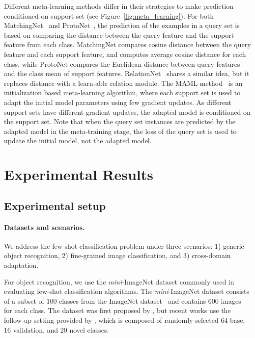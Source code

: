 \documentclass{article}
\newlength\paramargin
\newlength\secmargin
\newcommand{\figref}[1]{Figure~\ref{fig:#1}}
\def \miniI {\emph{mini}-ImageNet }
\begin{document}
Different meta-learning methods differ in their strategies to make prediction conditioned on support set (see \figref{meta_learning}). For both MatchingNet~\cite{vinyals2016matching} and ProtoNet~\cite{snell2017prototypical}, the prediction of the examples in a query set  is based on comparing the distance between the query feature and the support feature from each class. MatchingNet compares cosine distance between the query feature and each support feature, and computes average cosine distance for each class, while ProtoNet compares the Euclidean distance between query features and the class mean of support features. RelationNet~\cite{sung2018learning} shares a similar idea, but it replaces distance with a learn-able relation module. 
The MAML method~\cite{finn2017model} is an initialization based meta-learning algorithm, where each support set is used to adapt the initial model parameters using few gradient updates. As different support sets have different gradient updates, the adapted model is conditioned on the support set. Note that when the query set instances are predicted by the adapted model in the meta-training stage, the loss of the query set is used to update the initial model, not the adapted model.
%
 \vspace{\secmargin}
\section{Experimental Results}
\label{sec:results}



\vspace{\secmargin}
\subsection{Experimental setup}
\label{sec:setup}
\vspace{\paramargin}
\paragraph{Datasets and scenarios.}
We address the few-shot classification problem under three scenarios: 
1) generic object recognition, 
2) fine-grained image classification, and 
3) cross-domain adaptation.

For object recognition, we use the \miniI dataset commonly used in evaluating few-shot classification algorithms. The \miniI dataset consists of a subset of 100 classes from the ImageNet dataset~\cite{deng2009imagenet} and contains 600 images for each class. The dataset was first proposed by \cite{vinyals2016matching}, but recent works use the follow-up setting provided by \cite{ravi2017optimization}, which is composed of randomly selected 64 base, 16 validation, and 20 novel classes.
\end{document}
